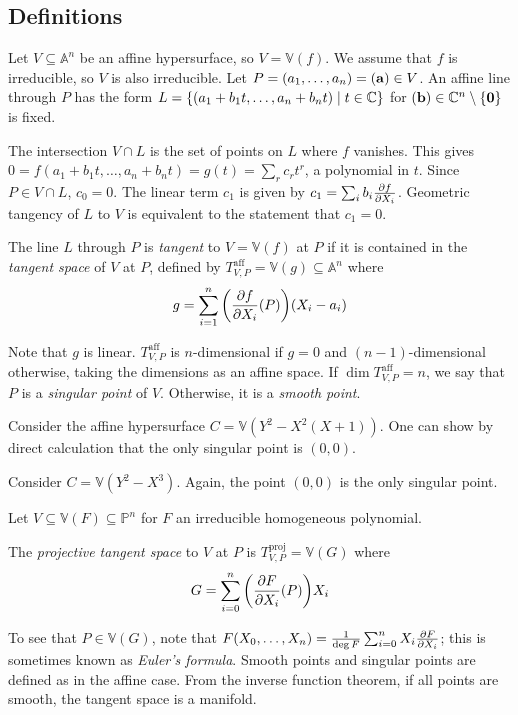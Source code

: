 \subsection{Definitions}
Let \( V \subseteq \mathbb A^n \) be an affine hypersurface, so \( V = \mathbb V(f) \).
We assume that \( f \) is irreducible, so \( V \) is also irreducible.
Let \( P = (a_1, \dots, a_n) = (\vb a) \in V \).
An affine line through \( P \) has the form \( L = \qty{(a_1 + b_1 t, \dots, a_n + b_n t) \mid t \in \mathbb C} \) for \( (\vb b) \in \mathbb C^n \setminus \qty{\vb 0} \) is fixed.

The intersection \( V \cap L \) is the set of points on \( L \) where \( f \) vanishes.
This gives \( 0 = f(a_1 + b_1 t, \dots, a_n + b_n t) = g(t) = \sum_r c_r t^r \), a polynomial in \( t \).
Since \( P \in V \cap L \), \( c_0 = 0 \).
The linear term \( c_1 \) is given by \( c_1 = \sum_i b_i \pdv{f}{X_i}(\vb a) \).
Geometric tangency of \( L \) to \( V \) is equivalent to the statement that \( c_1 = 0 \).
\begin{definition}
    The line \( L \) through \( P \) is \emph{tangent} to \( V = \mathbb V(f) \) at \( P \) if it is contained in the \emph{tangent space} of \( V \) at \( P \), defined by \( T_{V,P}^{\mathrm{aff}} = \mathbb V(g) \subseteq \mathbb A^n \) where
    \[ g = \sum_{i=1}^n \qty(\pdv{f}{X_i}\qty(P))(X_i - a_i) \]
\end{definition}
Note that \( g \) is linear.
\( T_{V,P}^{\mathrm{aff}} \) is \( n \)-dimensional if \( g = 0 \) and \( (n-1) \)-dimensional otherwise, taking the dimensions as an affine space.
If \( \dim T_{V,P}^{\mathrm{aff}} = n \), we say that \( P \) is a \emph{singular point} of \( V \).
Otherwise, it is a \emph{smooth point}.
\begin{example}
    Consider the affine hypersurface \( C = \mathbb V(Y^2 - X^2(X+1)) \).
    One can show by direct calculation that the only singular point is \( (0, 0) \).
\end{example}
\begin{example}[cusp]
    Consider \( C = \mathbb V(Y^2 - X^3) \).
    Again, the point \( (0, 0) \) is the only singular point.
\end{example}
Let \( V \subseteq \mathbb V(F) \subseteq \mathbb P^n \) for \( F \) an irreducible homogeneous polynomial.
\begin{definition}
    The \emph{projective tangent space} to \( V \) at \( P \) is \( T_{V,P}^{\mathrm{proj}} = \mathbb V(G) \) where
    \[ G = \sum_{i=0}^n \qty(\pdv{F}{X_i}\qty(P)) X_i \]
\end{definition}
To see that \( P \in \mathbb V(G) \), note that \( F(X_0, \dots, X_n) = \frac{1}{\deg F} \sum_{i=0}^n X_i \pdv{F}{X_i} \); this is sometimes known as \emph{Euler's formula}.
Smooth points and singular points are defined as in the affine case.
From the inverse function theorem, if all points are smooth, the tangent space is a manifold.

